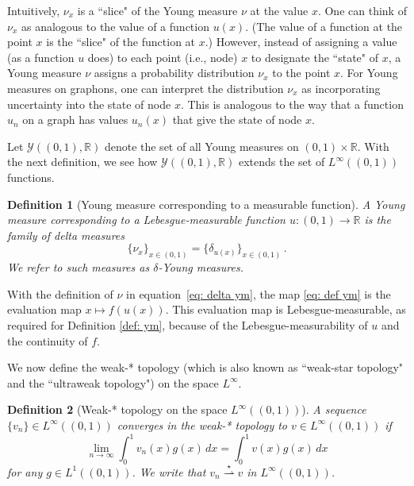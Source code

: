 \documentclass[11pt]{amsart}
\newtheorem{definition}{Definition}[section]
\def\R{\mathbb{R}}
\def\ra{\rightarrow}
\def\weakstarra{\stackrel{\star}{\rightharpoonup}}
\numberwithin{equation}{section}
\begin{document}
{Intuitively, $\nu_x$ is a ``slice" of the Young measure $\nu$ at the value $x$. One can think of $\nu_x$ as analogous to the value of a function $u(x)$. (The value of a function at the point $x$ is the ``slice" of the function at $x$.) However, instead of assigning a value (as a function $u$ does) to each point (i.e., node) $x$ to designate the ``state" of $x$, a Young measure $\nu$ assigns a probability distribution $\nu_x$ to the point $x$. For Young measures on graphons, one can interpret the distribution $\nu_x$ as incorporating uncertainty into the state of node $x$. This is analogous to the way that a function $u_n$ on a graph has values $u_n(x)$ that give the state of node $x$.



Let $\mathcal{Y}((0,1),\R)$ denote the set of all Young measures on $(0,1) \times \R$. With the next definition, we see how $\mathcal{Y}((0,1),\R)$ extends the set of $L^\infty((0,1))$ functions. 

\begin{definition}[Young measure corresponding to a measurable function]
    A \emph{Young measure corresponding to a {Lebesgue-}measurable function} $u: (0,1) \ra \R$ is the family of delta measures 
\begin{equation} 
    \{\nu_x\}_{x\in (0,1)} = \{\delta_{u(x)}\}_{x\in (0,1)} \,. 
\label{eq: delta ym}
\end{equation}
{We refer to such measures as \emph{$\delta$-Young measures.}}


\end{definition}

With the definition of $\nu$ in equation~\eqref{eq: delta ym}, the map \eqref{eq: def ym} is the evaluation map $x \mapsto f(u(x))$. {This evaluation map is Lebesgue-measurable, as required for Definition \ref{def: ym}, because of the Lebesgue-measurability of $u$ and the continuity of $f$.} 

We now define the {weak-* topology (which is also known as ``weak-star topology" and the ``ultraweak topology")} on {the space} $L^\infty$.

\begin{definition}[Weak-* topology {on the space $L^\infty((0,1))$}]
A sequence {$\{v_n\} \in L^\infty((0,1))$} converges in the weak-* topology to {$v \in L^\infty((0,1))$} if 
\begin{equation*}
    \lim_{n\ra \infty} \int_0^1 {v_n(x)}g(x) \, dx = \int_0^1 {v(x)}g(x) \, dx
\end{equation*}
for any $g \in L^1((0,1))$. We write that $v_n \weakstarra v$ in $L^\infty((0,1))$. 
\end{definition}


}
\end{document}
